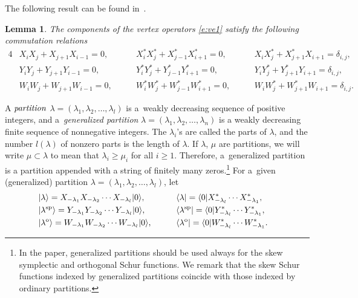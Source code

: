 \documentclass[10pt,a4paper]{amsart}
\numberwithin{equation}{section}
\newtheorem{Lemma}[Theorem]{Lemma}
\begin{document}
The following result can be found in~\cite[Theorem~3.4, Proposition~3.6]{JN2015}.
\begin{Lemma}The components of the vertex operators \eqref{e:ve1} satisfy the following commutation relations
\begin{alignat}{4}
&X_iX_j+X_{j+1}X_{i-1}=0,\quad\ && X^*_iX^*_j+X^*_{j-1}X^*_{i+1}=0,\quad\ && X_iX^*_j+X^*_{j+1}X_{i+1}=\delta_{i,j},&\nonumber\\
&Y_iY_j+Y_{j+1}Y_{i-1}=0,\quad\ && Y^*_iY^*_j+Y^*_{j-1}Y^*_{i+1}=0,\quad\ && Y_iY^*_j+Y^*_{j+1}Y_{i+1}=\delta_{i,j},&\label{e:com}\\
&W_iW_j+W_{j+1}W_{i-1}=0,\quad\ && W^*_iW^*_j+W^*_{j-1}W^*_{i+1}=0,\quad\ && W_iW^*_j+W^*_{j+1}W_{i+1}=\delta_{i,j}.&\nonumber
\end{alignat}
\end{Lemma}
A ${\it partition}$ $\lambda=(\lambda_1,\lambda_2,\dots,\lambda_l)$ is a~weakly decreasing sequence of positive integers, and
a~{\it generalized partition} $\lambda=(\lambda_1,\lambda_2,\dots,\lambda_n)$ is a weakly decreasing finite sequence of nonnegative integers. The $\lambda_i$'s are
called the parts of $\lambda$, and the number $l(\lambda)$ of nonzero parts is the length of $\lambda$. If $\lambda$, $\mu$ are partitions, we will write $\mu\subset\lambda$ to mean that $\lambda_i\geq \mu_i$ for all $i\geq 1$. Therefore, a~generalized partition is a partition appended with
a string of finitely many zeros.\footnote{In the paper, generalized partitions should be used always for the skew symplectic and orthogonal Schur functions. We remark that the skew Schur functions
indexed by generalized partitions coincide with those indexed by ordinary partitions.} For a~given (generalized) partition $\lambda=(\lambda_1,\lambda_2,\dots,\lambda_l)$, let
\begin{alignat}{3}
\label{e:sc2}&|\lambda\rangle=X_{-\lambda_1}X_{-\lambda_2}\cdots X_{-\lambda_l}|0\rangle,\qquad&& \langle \lambda|=\langle 0|X^*_{-\lambda_l}\cdots X^*_{-\lambda_1},&\\
\label{e:sp6}&|\lambda^{\rm sp}\rangle=Y_{-\lambda_1}Y_{-\lambda_2}\cdots Y_{-\lambda_l}|0\rangle, \qquad&&\langle \lambda^{\rm sp}|=\langle 0|Y^*_{-\lambda_l}\cdots Y^*_{-\lambda_1},&\\
\label{e:o6}&|\lambda^{\rm o}\rangle=W_{-\lambda_1}W_{-\lambda_2}\cdots W_{-\lambda_l}|0\rangle,\qquad&&\langle \lambda^{\rm o}|=\langle 0|W^*_{-\lambda_l}\cdots W^*_{-\lambda_1}.&
\end{alignat}
\end{document}
